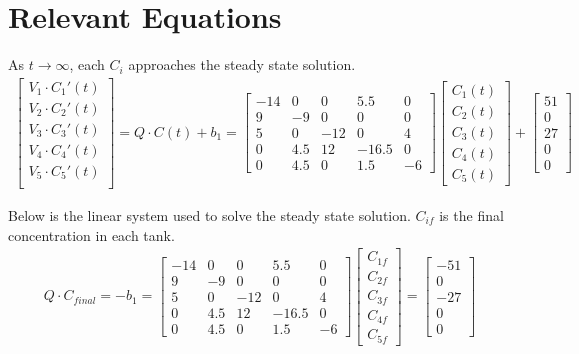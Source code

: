 \documentclass[a4paper, 12pt]{article}
\begin{document}
\section{Relevant Equations}
As $t \rightarrow \infty$, each $C_i$ approaches the steady state solution.
\begin{align}
	\begin{bmatrix}
		V_1\cdot C_1'(t) \\
		V_2\cdot C_2'(t) \\
		V_3\cdot C_3'(t) \\
		V_4\cdot C_4'(t) \\
		V_5\cdot C_5'(t) \\
	\end{bmatrix} = Q\cdot C(t)+b_1 =
	\begin{bmatrix}
		-14 & 0 & 0 & 5.5 & 0\\
		9 & -9 & 0 & 0 & 0\\
		5 & 0 & -12 & 0 & 4\\
		0 & 4.5 & 12 & -16.5 & 0 \\
		0 & 4.5 & 0 & 1.5 & -6
	\end{bmatrix}
	\begin{bmatrix}
		C_1(t)\\C_2(t)\\C_3(t)\\C_4(t)\\C_5(t)
	\end{bmatrix} +
	\begin{bmatrix}
		51\\0\\27\\0\\0
	\end{bmatrix}
\end{align}

Below is the linear system used to solve the steady state solution. $C_{if}$ is the final concentration in each tank.
\begin{align}
	Q\cdot C_{final}=-b_1=
	\begin{bmatrix}
		-14 & 0 & 0 & 5.5 & 0\\
		9 & -9 & 0 & 0 & 0\\
		5 & 0 & -12 & 0 & 4\\
		0 & 4.5 & 12 & -16.5 & 0 \\
		0 & 4.5 & 0 & 1.5 & -6
	\end{bmatrix}
	\begin{bmatrix}
		C_{1f}\\C_{2f}\\C_{3f}\\C_{4f}\\C_{5f}
	\end{bmatrix} =
	\begin{bmatrix}
		-51\\0\\-27\\0\\0
	\end{bmatrix}
\end{align}
\end{document}

